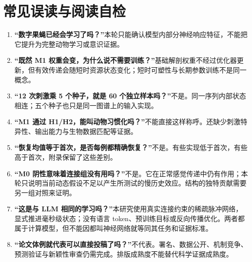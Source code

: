 \section{常见误读与阅读自检}
\begin{enumerate}
\item \textbf{“数字果蝇已经会学习了吗？”}本轮只能确认模型内部分神经响应特征，不能把它提升为完整动物学习或意识证据。
\item \textbf{“既然 M1 权重会变，为什么说不需要训练？”}基础解剖权重不经过优化器更新，但有效传递会随短时资源状态变化；短时可塑性与长期参数训练不是同一概念。
\item \textbf{“12 次刺激乘 5 个种子，就是 60 个独立样本吗？”}不是。同一序列内部状态相连；五个种子也只是同一图谱上的输入实现。
\item \textbf{“M1 通过 H1/H2，能叫动物习惯化吗？”}不能直接这样称呼。还缺少刺激特异性、输出能力与生物数据匹配等证据。
\item \textbf{“恢复均值等于首次，是否每例都精确恢复？”}不是。有些实现低于首次，有些高于首次，附录保留了这些差别。
\item \textbf{“M0 阴性意味着连接组没有用吗？”}不是。它在正常感觉传递中仍有作用；本轮只说明当前动态假设不足以产生所测试的慢历史效应。结构的独特贡献需要另一组对照来证明。
\item \textbf{“这是与 LLM 相同的学习吗？”}本研究使用真实连接约束的稀疏脉冲网络，显式推进毫秒级状态；没有语言 token、预训练目标或反向传播优化。两者都属于计算模型，但不能因都叫神经网络就等同其任务和证据标准。
\item \textbf{“论文体例就代表可以直接投稿了吗？”}不代表。署名、数据公开、机制竞争、预测验证与新颖性审查仍需完成。排版成熟度不能替代科学证据成熟度。
\end{enumerate}
\FloatBarrier
